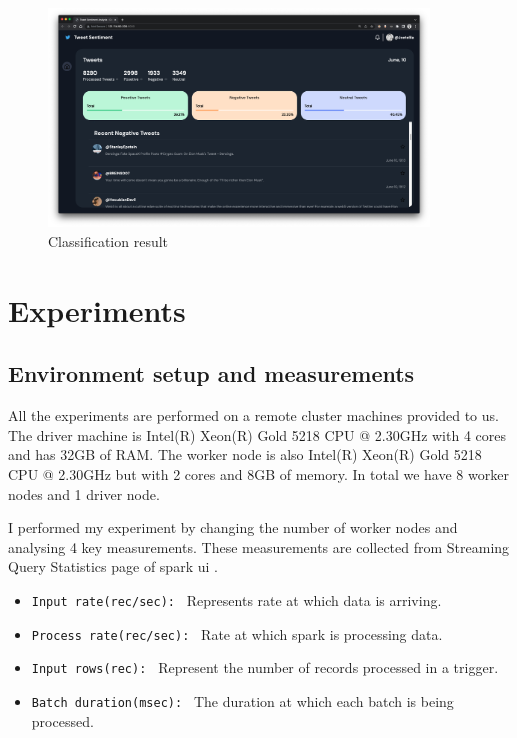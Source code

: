 \documentclass[12pt,a4paper]{report}
\begin{document}
\begin{figure}[H]
    \centering
\includegraphics[width=0.9\textwidth]{images/dashboardss.png}
    \caption{Classification result}
    \label{fig:confusion-svm}
\end{figure}

\chapter{Experiments}
\section{Environment setup and measurements}
All the experiments are performed on a remote cluster machines provided to us. The driver machine is Intel(R) Xeon(R) Gold 5218 CPU @ 2.30GHz with 4 cores and has 32GB of RAM. The worker node is also Intel(R) Xeon(R) Gold 5218 CPU @ 2.30GHz but with 2 cores and 8GB of memory. In total we have 8 worker nodes and 1 driver node.

I performed my experiment by changing the number of worker nodes and analysing 4 key measurements. These measurements are collected from Streaming Query Statistics page of spark ui \cite{sparkAnalysis}.

\begin{itemize}
   \item \verb|Input rate(rec/sec): | Represents rate at which data is arriving.
   \item \verb|Process rate(rec/sec): | Rate at which spark is processing data.
   \item \verb|Input rows(rec): | Represent the number of records processed in a trigger.
   \item \verb|Batch duration(msec): | The duration at which each batch is being processed.
\end{itemize}
\end{document}
